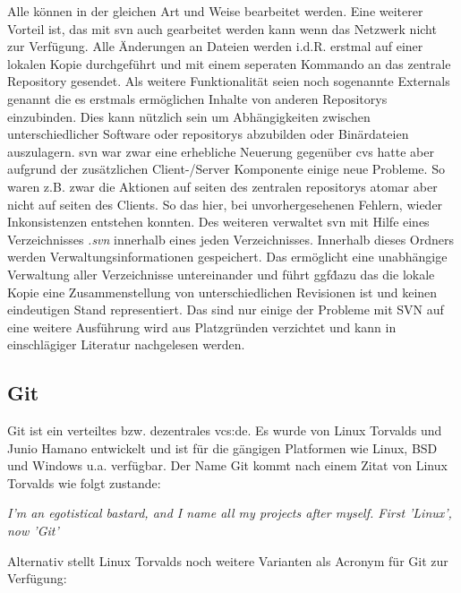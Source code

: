 Alle können in der gleichen Art und Weise bearbeitet werden. Eine weiterer
Vorteil ist, das mit \acrlong{svn} auch gearbeitet werden kann wenn das
Netzwerk nicht zur Verfügung. Alle Änderungen an Dateien werden i.d.R.  erstmal
auf einer lokalen Kopie durchgeführt und mit einem seperaten Kommando an das
zentrale Repository gesendet. Als weitere Funktionalität seien noch sogenannte
Externals genannt die es erstmals ermöglichen Inhalte von anderen Repositorys
einzubinden. Dies kann nützlich sein um Abhängigkeiten zwischen
unterschiedlicher Software oder \glspl{repository} abzubilden oder Binärdateien
auszulagern. \acrlong{svn} war zwar eine erhebliche Neuerung gegenüber
\acrlong{cvs} hatte aber aufgrund der zusätzlichen Client-/Server Komponente
einige neue Probleme. So waren z.B. zwar die Aktionen auf seiten des zentralen
\glspl{repository} atomar aber nicht auf seiten des Clients. So das hier, bei
unvorhergesehenen Fehlern, wieder Inkonsistenzen entstehen konnten.  Des
weiteren verwaltet \acrshort{svn} mit Hilfe eines Verzeichnisses \textit{.svn}
innerhalb eines jeden Verzeichnisses. Innerhalb dieses Ordners werden
Verwaltungsinformationen gespeichert. Das ermöglicht eine unabhängige
Verwaltung aller Verzeichnisse untereinander und führt ggf\. dazu das die
lokale Kopie eine Zusammenstellung von unterschiedlichen Revisionen ist und
keinen eindeutigen Stand representiert. Das sind nur einige der Probleme mit
SVN auf eine weitere Ausführung wird aus Platzgründen verzichtet und kann in
einschlägiger Literatur nachgelesen werden.\cite[s.~383-385]{cd}

\subsection{Git}\label{git}
Git ist ein verteiltes bzw. dezentrales \acrlong{vcs:de}. Es wurde von Linux
Torvalds und Junio Hamano entwickelt und ist für die gängigen Platformen wie
Linux, BSD und Windows u.a. verfügbar. Der Name Git kommt nach einem Zitat von
Linux Torvalds wie folgt zustande\cite{link:gitfaq}:

\begin{center}
\textit{\glqq{}I'm an egotistical bastard, and I name all my projects after
myself. First 'Linux', now 'Git'\grqq{}}\\
\end{center}

Alternativ stellt Linux Torvalds noch
weitere Varianten als Acronym für Git zur Verf\-ügung\cite{link:gitfaq}:

